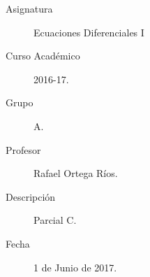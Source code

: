 \documentclass[12pt]{article}
\begin{document}

    
    

    \begin{description}
        \item[Asignatura] Ecuaciones Diferenciales I
        \item[Curso Académico] 2016-17.
        \item[Grupo] A.
        \item[Profesor] Rafael Ortega Ríos.
        \item[Descripción] Parcial C.
        \item[Fecha] 1 de Junio de 2017.
    
    \end{description}
    \newpage
\end{document}
